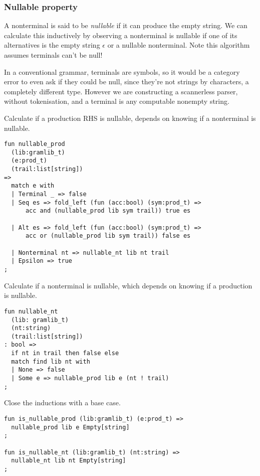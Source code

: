 \documentclass[oneside]{book}
\begin{document}
\subsubsection{Nullable property}
A nonterminal is said to be {\em nullable} if it can produce
the empty string. We can calculate this inductively by observing
a nonterminal is nullable if one of its alternatives is the empty
string $\epsilon$ or a nullable nonterminal. Note this algorithm
assumes terminals can't be null!

In a conventional grammar, terminals are symbols, so it would be a
category error to even ask if they could be null, since they're not
strings by characters, a completely different type. However
we are constructing a scannerless parser, without tokenisation,
and a terminal is any computable nonempty string.


Calculate if a production RHS is nullable, depends on
knowing if a nonterminal is nullable.

\begin{verbatim}
fun nullable_prod 
  (lib:gramlib_t) 
  (e:prod_t) 
  (trail:list[string]) 
=>
  match e with
  | Terminal _ => false
  | Seq es => fold_left (fun (acc:bool) (sym:prod_t) => 
      acc and (nullable_prod lib sym trail)) true es

  | Alt es => fold_left (fun (acc:bool) (sym:prod_t) => 
      acc or (nullable_prod lib sym trail)) false es

  | Nonterminal nt => nullable_nt lib nt trail
  | Epsilon => true
;
\end{verbatim}

Calculate if a nonterminal is nullable, which depends on
knowing if a production is nullable.

\begin{verbatim}
fun nullable_nt 
  (lib: gramlib_t) 
  (nt:string) 
  (trail:list[string]) 
: bool =>
  if nt in trail then false else
  match find lib nt with
  | None => false
  | Some e => nullable_prod lib e (nt ! trail)
;
\end{verbatim}

Close the inductions with a base case.

\begin{verbatim}
fun is_nullable_prod (lib:gramlib_t) (e:prod_t) => 
  nullable_prod lib e Empty[string]
;

fun is_nullable_nt (lib:gramlib_t) (nt:string) => 
  nullable_nt lib nt Empty[string]
;
\end{verbatim}
\end{document}
